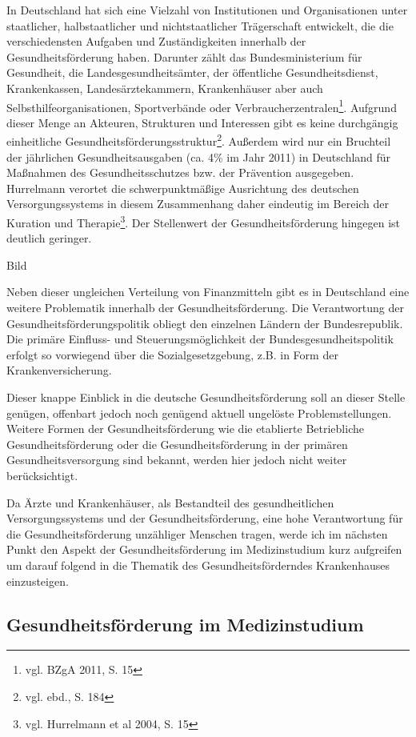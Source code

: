 In Deutschland hat sich eine Vielzahl von Institutionen und Organisationen unter staatlicher, halbstaatlicher und nichtstaatlicher Trägerschaft entwickelt, die die verschiedensten Aufgaben und Zuständigkeiten innerhalb der Gesundheitsförderung haben. Darunter zählt das Bundesministerium für Gesundheit, die Landesgesundheitsämter, der öffentliche Gesundheitsdienst, Krankenkassen, Landesärztekammern, Krankenhäuser aber auch Selbsthilfeorganisationen, Sportverbände oder Verbraucherzentralen\footnote{vgl. BZgA 2011, S. 15}. Aufgrund dieser Menge an Akteuren, Strukturen und Interessen gibt es keine durchgängig einheitliche Gesundheitsförderungsstruktur\footnote{vgl. ebd., S. 184}. Außerdem wird nur ein Bruchteil der jährlichen Gesundheitsausgaben (ca. 4\% im Jahr 2011) in Deutschland für Maßnahmen des Gesundheitsschutzes bzw. der Prävention ausgegeben. Hurrelmann verortet die schwerpunktmäßige Ausrichtung des deutschen Versorgungssystems in diesem Zusammenhang daher eindeutig im Bereich der Kuration und Therapie\footnote{vgl. Hurrelmann et al 2004, S. 15}. Der Stellenwert der Gesundheitsförderung hingegen ist deutlich geringer.

Bild

Neben dieser ungleichen Verteilung von Finanzmitteln gibt es in Deutschland eine weitere Problematik innerhalb der Gesundheitsförderung. Die Verantwortung der Gesundheitsförderungspolitik obliegt den einzelnen Ländern der Bundesrepublik. Die primäre Einfluss- und Steuerungsmöglichkeit der Bundesgesundheitspolitik erfolgt so vorwiegend über die Sozialgesetzgebung, z.B. in Form der Krankenversicherung.

Dieser knappe Einblick in die deutsche Gesundheitsförderung soll an dieser Stelle genügen, offenbart jedoch noch genügend aktuell ungelöste Problemstellungen. Weitere Formen der Gesundheitsförderung wie die etablierte Betriebliche Gesundheitsförderung oder die Gesundheitsförderung in der primären Gesundheitsversorgung sind bekannt, werden hier jedoch nicht weiter berücksichtigt.

Da Ärzte und Krankenhäuser, als Bestandteil des gesundheitlichen Versorgungssystems und der Gesundheitsförderung, eine hohe Verantwortung für die Gesundheitsförderung unzähliger Menschen tragen, werde ich im nächsten Punkt den Aspekt der Gesundheitsförderung im Medizinstudium kurz aufgreifen um darauf folgend in die Thematik des Gesundheitsförderndes Krankenhauses einzusteigen.

\subsection{Gesundheitsförderung im Medizinstudium}
\label{sec:GesundheitsförderungImMedizinstudium}

